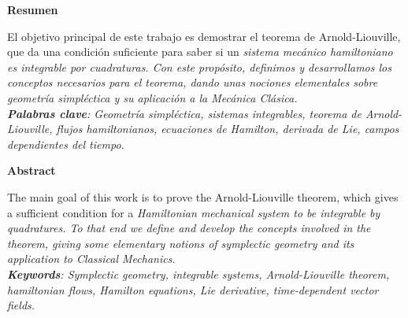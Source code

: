 \thispagestyle{empty}
\vspace*{3cm}
  \begin{center}
    \textbf{Resumen}
  \end{center}

  El objetivo principal de este trabajo es demostrar el teorema de Arnold-Liouville, que da una condición suficiente para saber si un \em sistema mecánico hamiltoniano \em  es \em integrable por cuadraturas\em. Con este propósito, definimos y desarrollamos los conceptos necesarios para el teorema, dando unas nociones elementales sobre \em geometría simpléctica \em  y su aplicación a la Mecánica Clásica.\\
  

  \noindent \textbf{Palabras clave}:\emph{ Geometría simpléctica, sistemas integrables, teorema de Arnold-Liouville, flujos hamiltonianos, ecuaciones de Hamilton, derivada de Lie, campos dependientes del tiempo.}\\


  \begin{center}
    \textbf{Abstract}
  \end{center}

The main goal of this work is to prove the Arnold-Liouville theorem, which gives a sufficient condition for a \em Hamiltonian mechanical system \em to be \em integrable by quadratures\em. To that end we define and develop the concepts involved in the theorem, giving some elementary notions of \em symplectic geometry \em and its application to Classical Mechanics.\\

\noindent \textbf{Keywords}:\emph{ Symplectic geometry, integrable systems, Arnold-Liouville theorem, hamiltonian flows, Hamilton equations, Lie derivative, time-dependent vector fields.}\\
\



